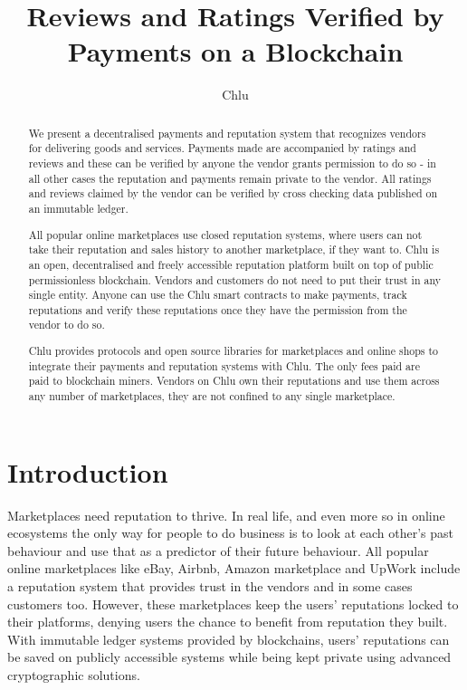 \documentclass[a4paper]{article}
\title{Reviews and Ratings Verified by Payments on a Blockchain}
\author{
  Chlu
}
\begin{document}
\maketitle

\begin{abstract}

We present a decentralised payments and reputation system that
recognizes vendors for delivering goods and services. Payments made
are accompanied by ratings and reviews and these can be verified by
anyone the vendor grants permission to do so - in all other cases the
reputation and payments remain private to the vendor. All ratings and
reviews claimed by the vendor can be verified by cross checking data
published on an immutable ledger.

All popular online marketplaces use closed reputation systems, where
users can not take their reputation and sales history to another
marketplace, if they want to. Chlu is an open, decentralised and
freely accessible reputation platform built on top of public
permissionless blockchain. Vendors and customers do not need to put
their trust in any single entity. Anyone can use the Chlu smart
contracts to make payments, track reputations and verify these
reputations once they have the permission from the vendor to do so.

Chlu provides protocols and open source libraries for marketplaces and
online shops to integrate their payments and reputation systems with
Chlu. The only fees paid are paid to blockchain miners. Vendors on
Chlu own their reputations and use them across any number of
marketplaces, they are not confined to any single marketplace.

\end{abstract}

\section{Introduction}

Marketplaces need reputation to thrive. In real life, and even more so
in online ecosystems the only way for people to do business is to look
at each other's past behaviour and use that as a predictor of their
future behaviour. All popular online marketplaces like eBay, Airbnb,
Amazon marketplace and UpWork include a reputation system that
provides trust in the vendors and in some cases customers
too. However, these marketplaces keep the users' reputations locked to
their platforms, denying users the chance to benefit from reputation
they built. With immutable ledger systems provided by blockchains,
users' reputations can be saved on publicly accessible systems while
being kept private using advanced cryptographic solutions.
\end{document}
